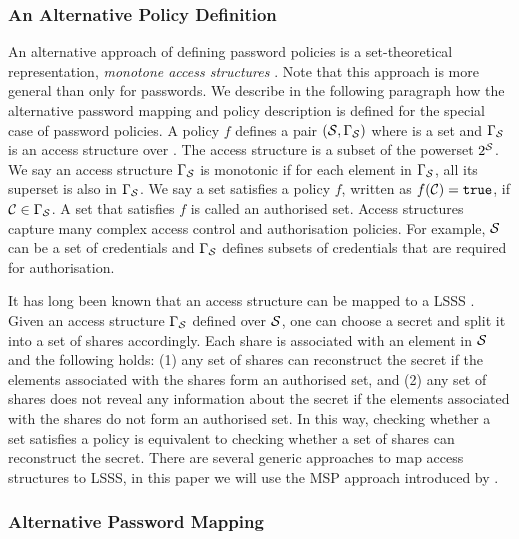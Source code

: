 \subsubsection{An Alternative Policy Definition} \label{sec:lsss}
An alternative approach of defining password policies is a set-theoretical representation, \ie \emph{monotone access structures} \cite{ito89}.
Note that this approach is more general than only for passwords.
We describe in the following paragraph how the alternative password mapping and policy description is defined for the special case of password policies.
A policy $f$ defines a pair $(\mathcal{S},\Gamma_\mathcal{S})$ where \cS is a set and $\Gamma_\mathcal{S}$ is an access structure over \cS. 
The access structure is a subset of the powerset $2^\mathcal{S}$. 
We say an access structure $\Gamma_\mathcal{S}$ is monotonic if for each element in $\Gamma_\mathcal{S}$, all its superset is also in $\Gamma_\mathcal{S}$. 
We say a set \cC satisfies a policy $f$, written as $f(\mathcal{C})=\mathtt{true}$, if $\mathcal{C}\in \Gamma_\mathcal{S}$. 
A set \cC that satisfies $f$ is called an authorised set. 
Access structures capture many complex access control and authorisation policies. For example, $\mathcal{S}$ can be a set of credentials and $\Gamma_\mathcal{S}$ defines subsets of credentials that are required for authorisation.

It has long been known that an access structure can be mapped to a \ac{LSSS} \cite{ito89,bei96}. 
Given an access structure $\Gamma_\mathcal{S}$ defined over $\mathcal{S}$, one can choose a secret and split it into a set of shares accordingly. 
Each share is associated with an element in $\mathcal{S}$ and the following holds: 
(1) any set of shares can reconstruct the secret if the elements associated with the shares form an authorised set, and 
(2) any set of shares does not reveal any information about the secret if the elements associated with the shares do not form an authorised set.
In this way, checking whether a set satisfies a policy is equivalent to checking whether a set of shares can reconstruct the secret. 
There are several generic approaches to map access structures to \ac{LSSS}, in this paper we will use the \ac{MSP} approach introduced by \citet{bei96}. 

\subsubsection{Alternative Password Mapping}

